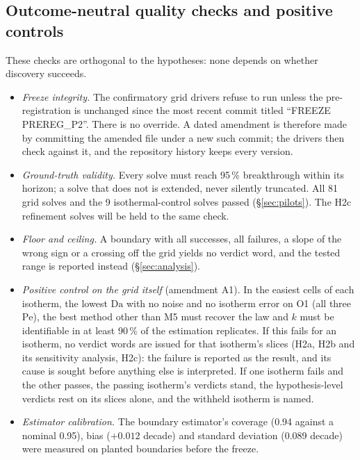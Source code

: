 \documentclass[11pt]{article}
\newcommand{\Da}{\mathrm{Da}}
\newcommand{\Pe}{\mathrm{Pe}}
\begin{document}
\subsection{Outcome-neutral quality checks and positive controls}
\label{sec:checks}
These checks are orthogonal to the hypotheses: none depends on whether discovery succeeds.
\begin{itemize}
\item \emph{Freeze integrity.} The confirmatory grid drivers refuse to run unless the
pre-registration is unchanged since the most recent commit titled ``FREEZE PREREG\_P2''.
There is no override. A dated amendment is therefore made by committing the amended file
under a new such commit; the drivers then check against it, and the repository history
keeps every version.
\item \emph{Ground-truth validity.} Every solve must reach 95\,\% breakthrough within its
horizon; a solve that does not is extended, never silently truncated. All 81 grid solves
and the 9 isothermal-control solves passed (\S\ref{sec:pilots}). The H2c refinement solves
will be held to the same check.
\item \emph{Floor and ceiling.} A boundary with all successes, all failures, a slope of the
wrong sign or a crossing off the grid yields no verdict word, and the tested range is
reported instead (\S\ref{sec:analysis}).
\item \emph{Positive control on the grid itself} (amendment A1). In the easiest cells of each
isotherm, the lowest $\Da$ with no noise and no isotherm error on O1 (all three $\Pe$), the
best method other than M5 must recover the law and $k$ must be identifiable in at least
90\,\% of the estimation replicates. If this fails for an isotherm, no verdict words are
issued for that isotherm's slices (H2a, H2b and its sensitivity analysis, H2c): the failure
is reported as the result, and its cause is sought before anything else is interpreted. If
one isotherm fails and the other passes, the passing isotherm's verdicts stand, the
hypothesis-level verdicts rest on its slices alone, and the withheld isotherm is named.
\item \emph{Estimator calibration.} The boundary estimator's coverage (0.94 against a
nominal 0.95), bias ($+0.012$ decade) and standard deviation (0.089 decade) were measured
on planted boundaries before the freeze.

\end{itemize}
\end{document}
